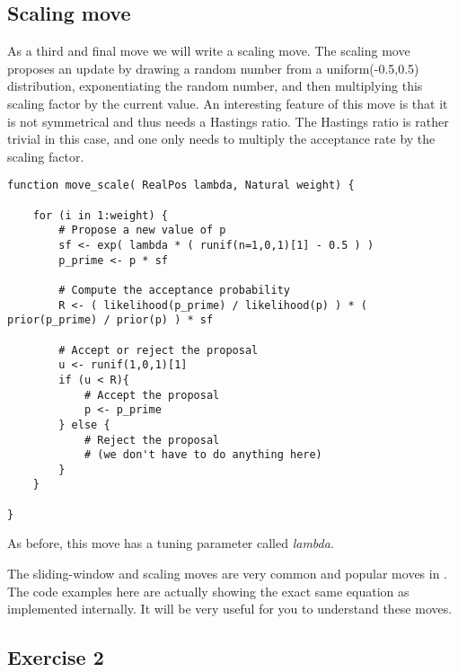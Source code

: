 \subsection{Scaling move}
As a third and final move we will write a scaling move.
The scaling move proposes an update by drawing a random number from a uniform(-0.5,0.5) distribution, exponentiating the random number, and then multiplying this scaling factor by the current value.
An interesting feature of this move is that it is not symmetrical and thus needs a Hastings ratio.
The Hastings ratio is rather trivial in this case, and one only needs to multiply the acceptance rate by the scaling factor.
{\tt \begin{snugshade*}
\begin{lstlisting}    
function move_scale( RealPos lambda, Natural weight) {

    for (i in 1:weight) {
        # Propose a new value of p
        sf <- exp( lambda * ( runif(n=1,0,1)[1] - 0.5 ) )
        p_prime <- p * sf

        # Compute the acceptance probability
        R <- ( likelihood(p_prime) / likelihood(p) ) * ( prior(p_prime) / prior(p) ) * sf
    
        # Accept or reject the proposal
        u <- runif(1,0,1)[1]
        if (u < R){
            # Accept the proposal
            p <- p_prime
        } else {
            # Reject the proposal
            # (we don't have to do anything here)
        }
    }
    
}
\end{lstlisting}
\end{snugshade*}}
As before, this move has a tuning parameter called \emph{lambda}.

\begin{framed}
The sliding-window and scaling moves are very common and popular moves in \RevBayes.
The code examples here are actually showing the exact same equation as implemented internally.
It will be very useful for you to understand these moves.	
\end{framed}

\pagebreak


\subsection{Exercise 2}


